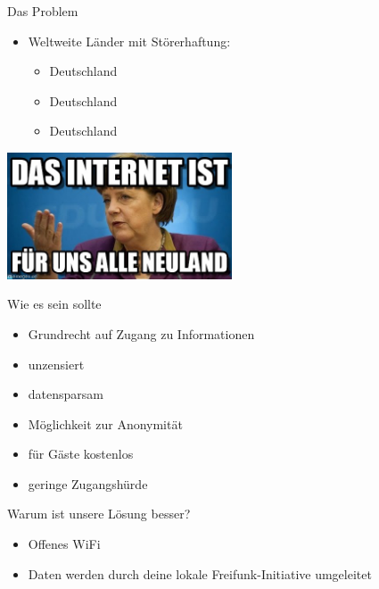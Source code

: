 \documentclass[fleqn,11pt,aspectratio=169]{beamer}
\begin{document}
\begin{frame}{Das Problem}
\begin{multicols*}{2}
\begin{block}{}
\begin{itemize}
		\item Weltweite Länder mit Störerhaftung:
		\pause
		\begin{itemize}
			\item Deutschland
			\pause
			\item Deutschland
			\pause
			\item Deutschland
			\pause
		\end{itemize}
	\end{itemize}
\end{block}
\centering
	\includegraphics[width=0.5\textwidth]{neuland.jpg}
\end{multicols*}
\end{frame}



\begin{frame}{Wie es sein sollte}
	\begin{itemize}
		\item	Grundrecht auf Zugang zu Informationen
		\pause
		\item unzensiert
		\pause
		\item datensparsam
		\pause
		\item Möglichkeit zur Anonymität
		\pause
		\item für Gäste kostenlos
		\pause
		\item geringe Zugangshürde
	\end{itemize}
\end{frame}


\begin{frame}{Warum ist unsere Lösung besser?}
\begin{itemize}
	\item Offenes WiFi
	\item Daten werden durch deine lokale Freifunk-Initiative umgeleitet
\end{itemize}
\end{frame}
\end{document}
